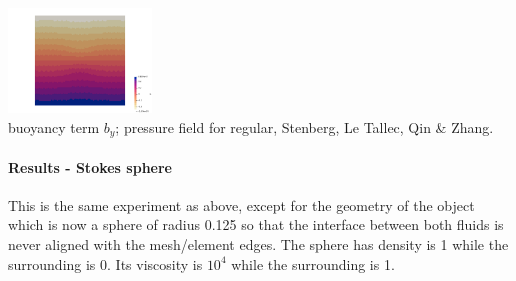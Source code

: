 \begin{center}
\includegraphics[width=3.8cm]{python_codes/fieldstone_78/results/block/full/p3}\\
{\captionfont buoyancy term $b_y$; pressure field for regular, Stenberg, Le Tallec, Qin \& Zhang.} 
\end{center}


\newpage
\paragraph{Results - Stokes sphere}

This is the same experiment as above, except for the geometry of the object 
which is now a sphere of radius 0.125 so that the interface between both fluids 
is never aligned with the mesh/element edges. The sphere has density is 1 while the surrounding is 0.
Its viscosity is $10^4$ while the surrounding is 1.

